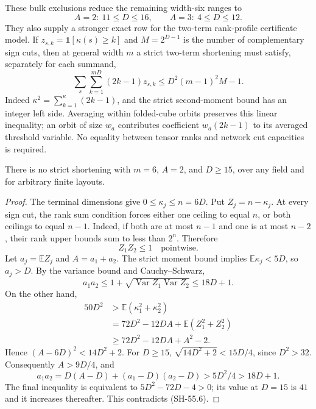 These bulk exclusions reduce the remaining width-six
ranges to
\[
       A=2:\ 11\leq D\leq16,
       \qquad A=3:\ 4\leq D\leq12.
\]
They also supply a stronger exact row for the two-term
rank-profile certificate model.  If
$z_{s,k}=\mathbf1[\kappa(s)\geq k]$ and
$M=2^{D-1}$ is the number of complementary sign cuts,
then at general width $m$ a strict two-term shortening
must satisfy, separately for each summand,
\[
 \sum_s\sum_{k=1}^{mD}(2k-1)z_{s,k}
 \leq D^2(m-1)^2M-1.
 \tag{SH-55.5}
\]
Indeed $\kappa^2=\sum_{k=1}^{\kappa}(2k-1)$,
and the strict second-moment bound has an integer left
side.  Averaging within folded-cube orbits preserves
this linear inequality; an orbit of size $w_a$
contributes coefficient $w_a(2k-1)$ to its averaged
threshold variable.  No equality between tensor ranks
and network cut capacities is required.

\begin{corollary}
\label{cor:width-six-two-term-coupled-moment}
There is no strict shortening with $m=6$, $A=2$, and
$D\geq15$, over any field and for arbitrary finite layouts.
\end{corollary}
\begin{proof}
The terminal dimensions give $0\leq\kappa_j\leq n=6D$.
Put $Z_j=n-\kappa_j$.  At every sign cut, the rank sum
condition forces either one ceiling to equal $n$, or
both ceilings to equal $n-1$.  Indeed, if both are at
most $n-1$ and one is at most $n-2$, their rank upper
bounds sum to less than $2^n$.  Therefore
\[
                 Z_1Z_2\leq1\quad\text{pointwise}.
\]
Let $a_j=\mathbb EZ_j$ and $A=a_1+a_2$.
The strict moment bound implies
$\mathbb E\kappa_j<5D$, so $a_j>D$.
By the variance bound and Cauchy--Schwarz,
\[
 a_1a_2\leq1+\sqrt{\operatorname{Var}Z_1
                         \operatorname{Var}Z_2}
          \leq18D+1.
 \tag{SH-55.6}
\]
On the other hand,
\[
\begin{split}
 50D^2
 &>\mathbb E(\kappa_1^2+\kappa_2^2)\\
 &=72D^2-12DA+\mathbb E(Z_1^2+Z_2^2)\\
 &\geq72D^2-12DA+A^2-2.
\end{split}
\]
Hence $(A-6D)^2<14D^2+2$.  For $D\geq15$,
$\sqrt{14D^2+2}<15D/4$, since $D^2>32$.
Consequently $A>9D/4$, and
\[
 a_1a_2=D(A-D)+(a_1-D)(a_2-D)
       >5D^2/4>18D+1.
\]
The final inequality is equivalent to
$5D^2-72D-4>0$; its value at $D=15$ is $41$
and it increases thereafter.  This contradicts
(SH-55.6).
\end{proof}

